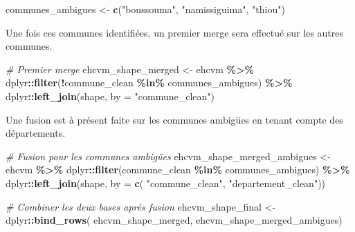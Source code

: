 \documentclass[
]{article}
\newenvironment{Shaded}{\begin{snugshade}}{\end{snugshade}}
\newcommand{\AttributeTok}[1]{\textcolor[rgb]{0.13,0.29,0.53}{#1}}
\newcommand{\CommentTok}[1]{\textcolor[rgb]{0.56,0.35,0.01}{\textit{#1}}}
\newcommand{\FunctionTok}[1]{\textcolor[rgb]{0.13,0.29,0.53}{\textbf{#1}}}
\newcommand{\NormalTok}[1]{#1}
\newcommand{\OtherTok}[1]{\textcolor[rgb]{0.56,0.35,0.01}{#1}}
\newcommand{\SpecialCharTok}[1]{\textcolor[rgb]{0.81,0.36,0.00}{\textbf{#1}}}
\newcommand{\StringTok}[1]{\textcolor[rgb]{0.31,0.60,0.02}{#1}}
\begin{document}
\begin{Shaded}
\begin{Highlighting}[]
\NormalTok{communes\_ambigues }\OtherTok{\textless{}{-}} \FunctionTok{c}\NormalTok{(}\StringTok{"boussouma"}\NormalTok{, }\StringTok{"namissiguima"}\NormalTok{, }\StringTok{"thiou"}\NormalTok{)}
\end{Highlighting}
\end{Shaded}

Une fois ces communes identifiées, un premier merge sera effectué sur
les autres communes.

\begin{Shaded}
\begin{Highlighting}[]
\CommentTok{\# Premier merge}
\NormalTok{ehcvm\_shape\_merged }\OtherTok{\textless{}{-}}\NormalTok{ ehcvm }\SpecialCharTok{\%\textgreater{}\%}
\NormalTok{  dplyr}\SpecialCharTok{::}\FunctionTok{filter}\NormalTok{(}\SpecialCharTok{!}\NormalTok{commune\_clean }\SpecialCharTok{\%in\%}\NormalTok{ communes\_ambigues) }\SpecialCharTok{\%\textgreater{}\%}
\NormalTok{  dplyr}\SpecialCharTok{::}\FunctionTok{left\_join}\NormalTok{(shape, }\AttributeTok{by =} \StringTok{"commune\_clean"}\NormalTok{)}
\end{Highlighting}
\end{Shaded}

Une fusion est à présent faite sur les communes ambigües en tenant
compte des départements.

\begin{Shaded}
\begin{Highlighting}[]
\CommentTok{\# Fusion pour les communes ambigües}
\NormalTok{ehcvm\_shape\_merged\_ambigues }\OtherTok{\textless{}{-}}\NormalTok{ ehcvm }\SpecialCharTok{\%\textgreater{}\%}
\NormalTok{  dplyr}\SpecialCharTok{::}\FunctionTok{filter}\NormalTok{(commune\_clean }\SpecialCharTok{\%in\%}\NormalTok{ communes\_ambigues) }\SpecialCharTok{\%\textgreater{}\%}
\NormalTok{  dplyr}\SpecialCharTok{::}\FunctionTok{left\_join}\NormalTok{(shape, }\AttributeTok{by =} \FunctionTok{c}\NormalTok{(}
    \StringTok{"commune\_clean"}\NormalTok{, }\StringTok{"departement\_clean"}\NormalTok{))}

\CommentTok{\# Combiner les deux bases après fusion}
\NormalTok{ehcvm\_shape\_final }\OtherTok{\textless{}{-}}\NormalTok{ dplyr}\SpecialCharTok{::}\FunctionTok{bind\_rows}\NormalTok{(}
\NormalTok{  ehcvm\_shape\_merged, ehcvm\_shape\_merged\_ambigues)}
\end{Highlighting}
\end{Shaded}
\end{document}
